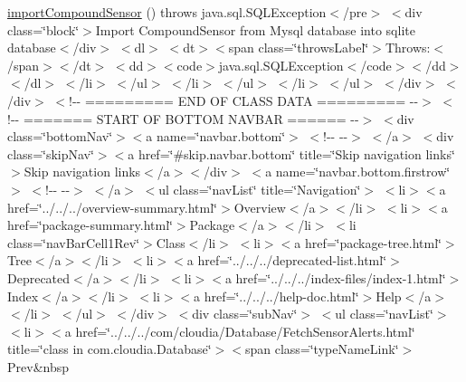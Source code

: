 \begin{DoxyCompactItemize}
\hyperlink{_my_s_q_l_connector_8html_a80f2884f9b5cef0fe045aae41a20274b}{import\-Compound\-Sensor} ()  throws java.\-sql.\-S\-Q\-L\-Exception$<$/pre$>$ $<$div class=\char`\"{}block\char`\"{}$>$\-Import Compound\-Sensor from Mysql database into sqlite database$<$/div$>$ $<$dl$>$ $<$dt$>$$<$span class=\char`\"{}throws\-Label\char`\"{}$>$\-Throws\-:$<$/span$>$$<$/dt$>$ $<$dd$>$$<$code$>$java.\-sql.\-S\-Q\-L\-Exception$<$/code$>$$<$/dd$>$ $<$/dl$>$ $<$/li$>$ $<$/ul$>$ $<$/li$>$ $<$/ul$>$ $<$/li$>$ $<$/ul$>$ $<$/div$>$ $<$/div$>$ $<$!-\/-\/ ========= E\-N\-D O\-F C\-L\-A\-S\-S D\-A\-T\-A ========= -\/-\/$>$ $<$!-\/-\/ ======= S\-T\-A\-R\-T O\-F B\-O\-T\-T\-O\-M N\-A\-V\-B\-A\-R ====== -\/-\/$>$ $<$div class=\char`\"{}bottom\-Nav\char`\"{}$>$$<$a name=\char`\"{}navbar.\-bottom\char`\"{}$>$ $<$!-\/-\/   -\/-\/$>$ $<$/a$>$ $<$div class=\char`\"{}skip\-Nav\char`\"{}$>$$<$a href=\char`\"{}\#skip.\-navbar.\-bottom\char`\"{} title=\char`\"{}\-Skip navigation links\char`\"{}$>$\-Skip navigation links$<$/a$>$$<$/div$>$ $<$a name=\char`\"{}navbar.\-bottom.\-firstrow\char`\"{}$>$ $<$!-\/-\/   -\/-\/$>$ $<$/a$>$ $<$ul class=\char`\"{}nav\-List\char`\"{} title=\char`\"{}\-Navigation\char`\"{}$>$ $<$li$>$$<$a href=\char`\"{}../../../overview-\/summary.\-html\char`\"{}$>$\-Overview$<$/a$>$$<$/li$>$ $<$li$>$$<$a href=\char`\"{}package-\/summary.\-html\char`\"{}$>$\-Package$<$/a$>$$<$/li$>$ $<$li class=\char`\"{}nav\-Bar\-Cell1\-Rev\char`\"{}$>$\-Class$<$/li$>$ $<$li$>$$<$a href=\char`\"{}package-\/tree.\-html\char`\"{}$>$\-Tree$<$/a$>$$<$/li$>$ $<$li$>$$<$a href=\char`\"{}../../../deprecated-\/list.\-html\char`\"{}$>$\-Deprecated$<$/a$>$$<$/li$>$ $<$li$>$$<$a href=\char`\"{}../../../index-\/files/index-\/1.\-html\char`\"{}$>$\-Index$<$/a$>$$<$/li$>$ $<$li$>$$<$a href=\char`\"{}../../../help-\/doc.\-html\char`\"{}$>$\-Help$<$/a$>$$<$/li$>$ $<$/ul$>$ $<$/div$>$ $<$div class=\char`\"{}sub\-Nav\char`\"{}$>$ $<$ul class=\char`\"{}nav\-List\char`\"{}$>$ $<$li$>$$<$a href=\char`\"{}../../../com/cloudia/\-Database/\-Fetch\-Sensor\-Alerts.\-html\char`\"{} title=\char`\"{}class in com.\-cloudia.\-Database\char`\"{}$>$$<$span class=\char`\"{}type\-Name\-Link\char`\"{}$>$\-Prev\&nbsp
\end{DoxyCompactItemize}
